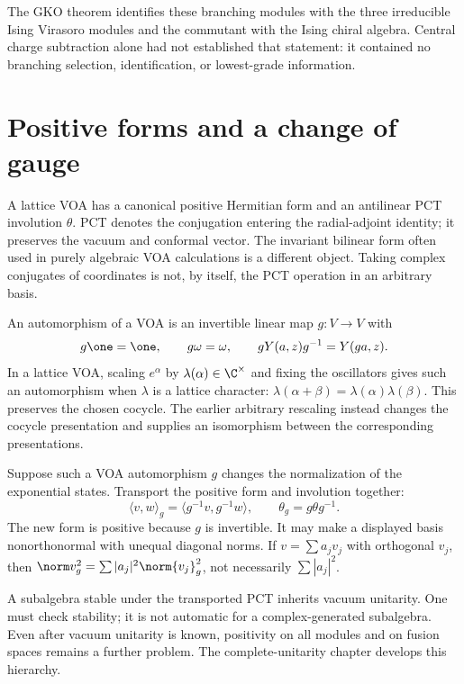 \begin{example}
The GKO theorem identifies these branching modules with the
three irreducible Ising Virasoro modules and the commutant with
the Ising chiral algebra. Central charge subtraction alone had
not established that statement: it contained no branching
selection, identification, or lowest-grade information.
\end{example}

\section{Positive forms and a change of gauge}

A lattice VOA has a canonical positive Hermitian form and an
antilinear PCT involution $\theta$. PCT denotes the conjugation
entering the radial-adjoint identity; it preserves the vacuum and
conformal vector. The invariant
bilinear form often used in purely algebraic VOA calculations is
a different object. Taking complex conjugates of coordinates is
not, by itself, the PCT operation in an arbitrary basis.

An automorphism of a VOA is an invertible linear map $g:V\to V$
with
\[
 g\one=\one,\qquad g\omega=\omega,\qquad
 gY(a,z)g^{-1}=Y(ga,z).
\]
In a lattice VOA, scaling $e^\alpha$ by
$\lambda(\alpha)\in\C^\times$ and fixing the oscillators gives
such an automorphism when $\lambda$ is a lattice character:
$\lambda(\alpha+\beta)=\lambda(\alpha)\lambda(\beta)$.
This preserves the chosen cocycle. The earlier arbitrary rescaling
instead changes the cocycle presentation and supplies an isomorphism
between the corresponding presentations.

Suppose such a VOA automorphism $g$ changes the normalization of
the exponential states. Transport the positive form and involution
together:
\begin{equation}
 \langle v,w\rangle_g=\langle g^{-1}v,g^{-1}w\rangle,
 \qquad \theta_g=g\theta g^{-1}.
 \label{eq:voa-gauge-transport}
\end{equation}
The new form is positive because $g$ is invertible. It may make a
displayed basis nonorthonormal with unequal diagonal norms. If
$v=\sum a_jv_j$ with orthogonal $v_j$, then
$\norm v_g^2=\sum|a_j|^2\norm{v_j}_g^2$, not necessarily
$\sum|a_j|^2$.

A subalgebra stable under the transported PCT inherits vacuum
unitarity. One must check stability; it is not automatic for a
complex-generated subalgebra. Even after vacuum unitarity is known,
positivity on all modules and on fusion spaces remains a further
problem. The complete-unitarity chapter develops this hierarchy.

